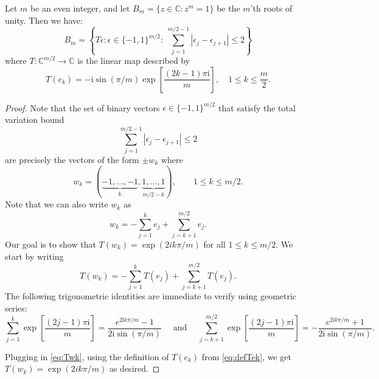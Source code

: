 \documentclass[10pt,a4paper]{amsart}
\newcommand{\CC}{\mathbb{C}}
\renewcommand{\i}{\mathrm{i}}
\begin{document}
\begin{lemma}\label{lem:zonotope_map}
    Let $m$ be an even integer, and let $B_m = \{z \in \CC : z^m=1\}$ be the $m$'th roots of unity. Then we have:
    \[
    B_m = \left\{T \epsilon : \epsilon \in \{-1,1\}^{m/2}:~\sum_{j=1}^{m/2-1} |\epsilon_j - \epsilon_{j+1}| \leq 2\right\}
    \]
    where $T:\CC^{m/2}\to \CC$ is the linear map described by
    \begin{equation}
        \label{eq:defTek}
    T(e_k) = -\i \sin(\pi/m) \exp\left[\frac{(2k-1)\pi\i}{m}\right],\quad 1\le k\le \frac{m}{2}.
    \end{equation}
\end{lemma}

\begin{proof}
    Note that the set of binary vectors $\epsilon \in \{-1,1\}^{m/2}$ that satisfy the total variation bound
    \[
    \sum_{j=1}^{m/2-1} |\epsilon_j - \epsilon_{j+1}| \leq 2
    \]
are precisely the vectors of the form $\pm w_k$ where
\[
w_k = (\underbrace{-1,\ldots,-1}_{k},\underbrace{1,\ldots,1}_{m/2-k}), \qquad 1\leq k \leq m/2.
\]
Note that we can also write $w_k$ as
\[
w_k = -\sum_{j=1}^k e_j + \sum_{j=k+1}^{m/2} e_j.
\]
Our goal is to show that $T(w_k) = \exp(2ik\pi /m)$ for all $1\leq k \leq m/2$. We start by writing
\begin{equation}
\label{eq:Twk}
T(w_k) = -\sum_{j=1}^k T(e_j) + \sum_{j=k+1}^{m/2} T(e_j).
\end{equation}
The following trigonometric identities are immediate to verify using geometric series: 
\[
\sum_{j=1}^k \exp\left[\frac{(2j-1)\pi\i}{m}\right] = \frac{e^{2\i k \pi /m} - 1}{2 \i \sin(\pi/m)}
\quad
\text{ and }
\quad
\sum_{j=k+1}^{m/2} \exp\left[\frac{(2j-1)\pi\i}{m}\right] = -\frac{e^{2\i k \pi /m} + 1}{2 \i \sin(\pi/m)}.
\]


Plugging in \eqref{eq:Twk}, using the definition of $T(e_k)$ from \eqref{eq:defTek}, we get $T(w_k) = \exp(2ik\pi/m)$ as desired.
\end{proof}
\end{document}
